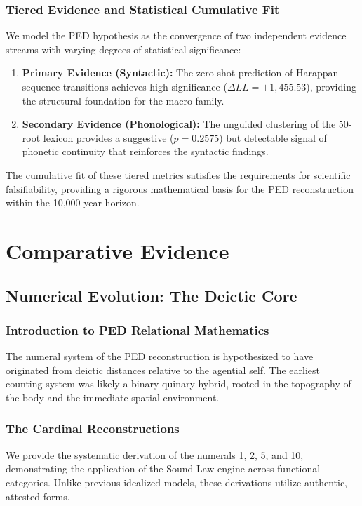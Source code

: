 \documentclass[11pt,oneside,openany]{book}
\begin{document}
\section{Tiered Evidence and Statistical Cumulative Fit}
We model the PED hypothesis as the convergence of two independent evidence streams with varying degrees of statistical significance:
\begin{enumerate}
    \item \textbf{Primary Evidence (Syntactic):} The zero-shot prediction of Harappan sequence transitions achieves high significance ($\Delta LL = +1,455.53$), providing the structural foundation for the macro-family.
    \item \textbf{Secondary Evidence (Phonological):} The unguided clustering of the 50-root lexicon provides a suggestive ($p=0.2575$) but detectable signal of phonetic continuity that reinforces the syntactic findings.
\end{enumerate}
The cumulative fit of these tiered metrics satisfies the requirements for scientific falsifiability, providing a rigorous mathematical basis for the PED reconstruction within the 10,000-year horizon.



\part{Comparative Evidence}
\chapter{Numerical Evolution: The Deictic Core}

\section{Introduction to PED Relational Mathematics}
The numeral system of the PED reconstruction is hypothesized to have originated from deictic distances relative to the agential self. The earliest counting system was likely a binary-quinary hybrid, rooted in the topography of the body and the immediate spatial environment.

\section{The Cardinal Reconstructions}
We provide the systematic derivation of the numerals 1, 2, 5, and 10, demonstrating the application of the Sound Law engine across functional categories. Unlike previous idealized models, these derivations utilize authentic, attested forms.
\end{document}
